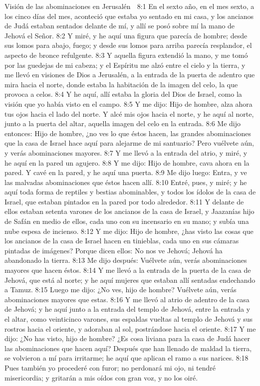 Visión de las abominaciones en Jerusalén  

8:1 En el sexto año, en el mes sexto, a los cinco días del mes, aconteció que estaba yo sentado en mi casa, y los ancianos de Judá estaban sentados delante de mí, y allí se posó sobre mí la mano de Jehová el Señor.  
8:2 Y miré, y he aquí una figura que parecía de hombre; desde sus lomos para abajo, fuego; y desde sus lomos para arriba parecía resplandor, el aspecto de bronce refulgente. 
8:3 Y aquella figura extendió la mano, y me tomó por las guedejas de mi cabeza; y el Espíritu me alzó entre el cielo y la tierra, y me llevó en visiones de Dios a Jerusalén, a la entrada de la puerta de adentro que mira hacia el norte, donde estaba la habitación de la imagen del celo, la que provoca a celos.  
8:4 Y he aquí, allí estaba la gloria del Dios de Israel, como la visión que yo había visto en el campo. 
8:5 Y me dijo: Hijo de hombre, alza ahora tus ojos hacia el lado del norte. Y alcé mis ojos hacia el norte, y he aquí al norte, junto a la puerta del altar, aquella imagen del celo en la entrada.  
8:6 Me dijo entonces: Hijo de hombre, ¿no ves lo que éstos hacen, las grandes abominaciones que la casa de Israel hace aquí para alejarme de mi santuario? Pero vuélvete aún, y verás abominaciones mayores.  
8:7 Y me llevó a la entrada del atrio, y miré, y he aquí en la pared un agujero.  
8:8 Y me dijo: Hijo de hombre, cava ahora en la pared. Y cavé en la pared, y he aquí una puerta.  
8:9 Me dijo luego: Entra, y ve las malvadas abominaciones que éstos hacen allí.  
8:10 Entré, pues, y miré; y he aquí toda forma de reptiles y bestias abominables, y todos los ídolos de la casa de Israel, que estaban pintados en la pared por todo alrededor.  
8:11 Y delante de ellos estaban setenta varones de los ancianos de la casa de Israel, y Jaazanías hijo de Safán en medio de ellos, cada uno con su incensario en su mano; y subía una nube espesa de incienso.  
8:12 Y me dijo: Hijo de hombre, ¿has visto las cosas que los ancianos de la casa de Israel hacen en tinieblas, cada uno en sus cámaras pintadas de imágenes? Porque dicen ellos: No nos ve Jehová; Jehová ha abandonado la tierra.  
8:13 Me dijo después: Vuélvete aún, verás abominaciones mayores que hacen éstos.  
8:14 Y me llevó a la entrada de la puerta de la casa de Jehová, que está al norte; y he aquí mujeres que estaban allí sentadas endechando a Tamuz.  
8:15 Luego me dijo: ¿No ves, hijo de hombre? Vuélvete aún, verás abominaciones mayores que estas.  
8:16 Y me llevó al atrio de adentro de la casa de Jehová; y he aquí junto a la entrada del templo de Jehová, entre la entrada y el altar, como veinticinco varones, sus espaldas vueltas al templo de Jehová y sus rostros hacia el oriente, y adoraban al sol, postrándose hacia el oriente.  
8:17 Y me dijo: ¿No has visto, hijo de hombre? ¿Es cosa liviana para la casa de Judá hacer las abominaciones que hacen aquí? Después que han llenado de maldad la tierra, se volvieron a mí para irritarme; he aquí que aplican el ramo a sus narices.  
8:18 Pues también yo procederé con furor; no perdonará mi ojo, ni tendré misericordia; y gritarán a mis oídos con gran voz, y no los oiré.  

